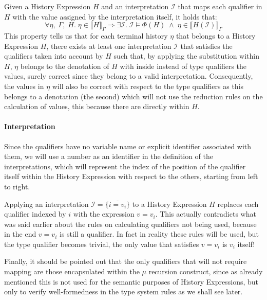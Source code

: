 \begin{theorem}
    Given a History Expression $H$ and an interpretation $\mathcal{I}$ that maps each qualifier in $H$ with the value assigned by the interpretation itself, it holds that:
    \begin{equation}
        \forall \eta, \;\Gamma, \;H. \;\eta \in \llbracket H \rrbracket_{\Gamma} \Longrightarrow \exists \mathcal{I}. \;\mathcal{I} \models \Phi(H) \;\land\; \eta \in \llbracket H(\mathcal{I}) \rrbracket_{\Gamma}
    \end{equation}
    This property tells us that for each terminal history $\eta$ that belongs to a History Expression $H$, there exists at least one interpretation $\mathcal{I}$ that satisfies the qualifiers taken into account by $H$ such that, by applying the substitution within $H$, $\eta$ belongs to the denotation of $H$ with inside instead of type qualifiers the values, surely correct since they belong to a valid interpretation. Consequently, the values in $\eta$ will also be correct with respect to the type qualifiers as this belongs to a denotation (the second) which will not use the reduction rules on the calculation of values, this because there are directly within $H$. 
    
    \paragraph{Interpretation} Since the qualifiers have no variable name or explicit identifier associated with them, we will use a number as an identifier in the definition of the interpretations, which will represent the index of the position of the qualifier itself within the History Expression with respect to the others, starting from left to right.
    
    Applying an interpretation $\mathcal{I} = \{\overline{i = v_i}\}$ to a History Expression $H$ replaces each qualifier indexed by $i$ with the expression $v = v_i$. This actually contradicts what was said earlier about the rules on calculating qualifiers not being used, because in the end $v = v_i$ is still a qualifier. In fact in reality these rules will be used, but the type qualifier becomes trivial, the only value that satisfies $v = v_i$ is $v_i$ itself!
    
    Finally, it should be pointed out that the only qualifiers that will not require mapping are those encapsulated within the $\mu$ recursion construct, since as already mentioned this is not used for the semantic purposes of History Expressions, but only to verify well-formedness in the type system rules as we shall see later.
\end{theorem}

